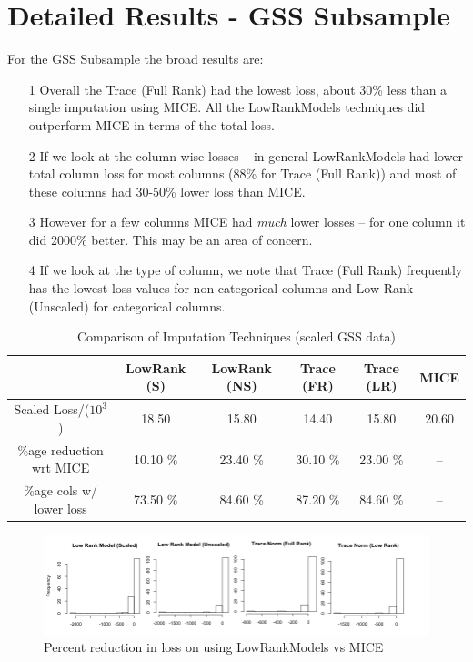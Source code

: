 \documentclass[11pt]{article} %
\begin{document}
\newpage

\section*{Detailed Results - GSS Subsample}
For the GSS Subsample the broad results are:
\begin{itemize}
\item[1] Overall the Trace (Full Rank) had the lowest loss, about 30\% less than a single imputation using MICE. All the LowRankModels techniques did outperform MICE in terms of the total loss.
\item[2] If we look at the column-wise losses -- in general LowRankModels had lower total column loss for most columns (88\% for Trace (Full Rank)) and most of these columns had 30-50\% lower loss than MICE.
\item[3] However for a few columns MICE had \textit{much} lower losses -- for one column it did 2000\% better. This may be an area of concern.
\item[4] If we look at the type of column, we note that Trace (Full Rank) frequently has the lowest loss values for non-categorical columns and Low Rank (Unscaled) for categorical columns.
\end{itemize}

\begin{table}[H]
\caption*{Comparison of Imputation Techniques (scaled GSS data)}
\centering
\begin{tabular}{|c|c|c|c|c|c|}
  \hline
 & LowRank (S) & LowRank (NS) & Trace (FR) & Trace (LR) & MICE \\ 
  \hline
Scaled Loss/($10^3$) & 18.50 & 15.80 & 14.40 & 15.80 & 20.60 \\ 
  \%age reduction wrt MICE & 10.10 \% & 23.40 \% & 30.10  \%& 23.00 \% & -- \\ 
  \%age cols w/ lower loss & 73.50 \% & 84.60  \%& 87.20 \% & 84.60 \% & -- \\ 
   \hline
\end{tabular}
\end{table}



\begin{figure}[H]
\caption*{Percent reduction in loss on using LowRankModels vs MICE}
\includegraphics[width = 1.2\textwidth]{PercentGain_GSS.png}
\end{figure}
\end{document}
